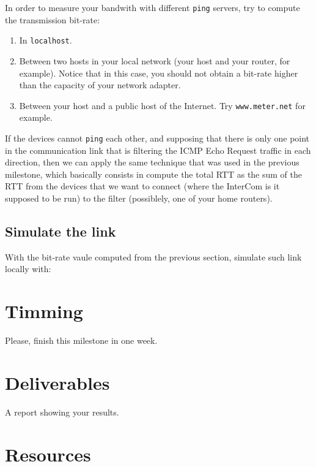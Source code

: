 In order to measure your bandwith with different \texttt{ping}
servers, try to compute the transmission bit-rate:
\begin{enumerate}
\item In \texttt{localhost}.
\item Between two hosts in your local network (your host and your
  router, for example). Notice that in this case, you should not
  obtain a bit-rate higher than the capacity of your network adapter.
\item Between your host and a public host of the Internet. Try
  \texttt{www.meter.net} for example.
\end{enumerate}

If the devices cannot \texttt{ping} each other, and supposing that
there is only one point in the communication link that is filtering
the ICMP Echo Request traffic in each direction, then we can apply the
same technique that was used in the previous milestone, which
basically consists in compute the total RTT as the sum of the RTT from
the devices that we want to connect (where the InterCom is it supposed
to be run) to the filter (possiblely, one of your home routers).

\subsection{Simulate the link}

With the bit-rate vaule computed from the previous section, simulate
such link locally with:

\section{Timming}

Please, finish this milestone in one week.

\section{Deliverables}

A report showing your results.

\section{Resources}


